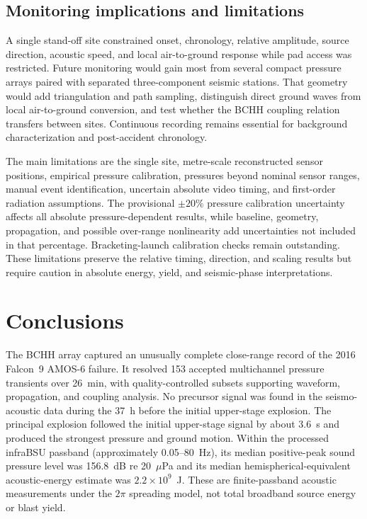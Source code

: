 \documentclass[]{seismica}
\begin{document}
\subsection{Monitoring implications and limitations}

A single stand-off site constrained onset, chronology, relative amplitude,
source direction, acoustic speed, and local air-to-ground response while pad
access was restricted. Future monitoring would gain most from several compact
pressure arrays paired with separated three-component seismic stations. That
geometry would add triangulation and path sampling, distinguish direct ground
waves from local air-to-ground conversion, and test whether the BCHH coupling
relation transfers between sites. Continuous recording remains essential for
background characterization and post-accident chronology.

The main limitations are the single site, metre-scale reconstructed sensor
positions, empirical pressure calibration, pressures beyond nominal sensor
ranges, manual event identification, uncertain absolute video timing, and
first-order radiation assumptions. The provisional $\pm20\%$ pressure
calibration uncertainty affects all absolute pressure-dependent results, while
baseline, geometry, propagation, and possible over-range nonlinearity add
uncertainties not included in that percentage. Bracketing-launch calibration
checks remain outstanding. These limitations preserve the relative timing,
direction, and scaling results but require caution in absolute energy, yield,
and seismic-phase interpretations.

\section{Conclusions}
\label{sec:conclusions}

The BCHH array captured an unusually complete close-range record of the 2016
Falcon~9 AMOS-6 failure. It resolved 153 accepted multichannel pressure
transients over 26~min, with quality-controlled subsets supporting waveform,
propagation, and coupling analysis. No precursor signal was found in the
seismo-acoustic data during the 37~h before the initial upper-stage explosion. The principal explosion followed
the initial upper-stage signal by about 3.6~s and produced the strongest pressure
and ground motion. Within the processed infraBSU passband (approximately
0.05--80~Hz), its median positive-peak sound pressure level was 156.8~dB re
20~$\mu$Pa and its median hemispherical-equivalent acoustic-energy estimate was
$2.2\times10^9$~J. These are
finite-passband acoustic measurements under the $2\pi$ spreading model, not
total broadband source energy or blast yield.
\end{document}
